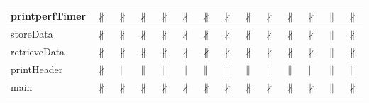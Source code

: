\documentclass[10pt]{article}
\begin{document}
\begin{longtable}{|l|l|l|l|l|l|l|l|l|l|l|l|l|l|}
\hline
printperfTimer&{\color{BrickRed}$\nparallel$}&{\color{BrickRed}$\nparallel$}&{\color{BrickRed}$\nparallel$}&{\color{BrickRed}$\nparallel$}&{\color{BrickRed}$\nparallel$}&{\color{BrickRed}$\nparallel$}&{\color{BrickRed}$\nparallel$}&{\color{BrickRed}$\nparallel$}&{\color{BrickRed}$\nparallel$}&{\color{BrickRed}$\nparallel$}&{\color{BrickRed}$\nparallel$}&{\color{blue}$\parallel$}&{\color{BrickRed}$\nparallel$}\\
\hline
storeData&{\color{BrickRed}$\nparallel$}&{\color{BrickRed}$\nparallel$}&{\color{BrickRed}$\nparallel$}&{\color{BrickRed}$\nparallel$}&{\color{BrickRed}$\nparallel$}&{\color{BrickRed}$\nparallel$}&{\color{BrickRed}$\nparallel$}&{\color{BrickRed}$\nparallel$}&{\color{BrickRed}$\nparallel$}&{\color{BrickRed}$\nparallel$}&{\color{BrickRed}$\nparallel$}&{\color{blue}$\parallel$}&{\color{BrickRed}$\nparallel$}\\
\hline
retrieveData&{\color{BrickRed}$\nparallel$}&{\color{BrickRed}$\nparallel$}&{\color{BrickRed}$\nparallel$}&{\color{BrickRed}$\nparallel$}&{\color{BrickRed}$\nparallel$}&{\color{BrickRed}$\nparallel$}&{\color{BrickRed}$\nparallel$}&{\color{BrickRed}$\nparallel$}&{\color{BrickRed}$\nparallel$}&{\color{BrickRed}$\nparallel$}&{\color{BrickRed}$\nparallel$}&{\color{blue}$\parallel$}&{\color{BrickRed}$\nparallel$}\\
\hline
printHeader&{\color{BrickRed}$\nparallel$}&{\color{blue}$\parallel$}&{\color{blue}$\parallel$}&{\color{blue}$\parallel$}&{\color{blue}$\parallel$}&{\color{blue}$\parallel$}&{\color{blue}$\parallel$}&{\color{blue}$\parallel$}&{\color{blue}$\parallel$}&{\color{blue}$\parallel$}&{\color{blue}$\parallel$}&{\color{blue}$\parallel$}&{\color{blue}$\parallel$}\\
\hline
main&{\color{BrickRed}$\nparallel$}&{\color{BrickRed}$\nparallel$}&{\color{BrickRed}$\nparallel$}&{\color{BrickRed}$\nparallel$}&{\color{BrickRed}$\nparallel$}&{\color{BrickRed}$\nparallel$}&{\color{BrickRed}$\nparallel$}&{\color{BrickRed}$\nparallel$}&{\color{BrickRed}$\nparallel$}&{\color{BrickRed}$\nparallel$}&{\color{BrickRed}$\nparallel$}&{\color{blue}$\parallel$}&{\color{BrickRed}$\nparallel$}\\
\hline
\end{longtable}
\newpage
\end{document}
